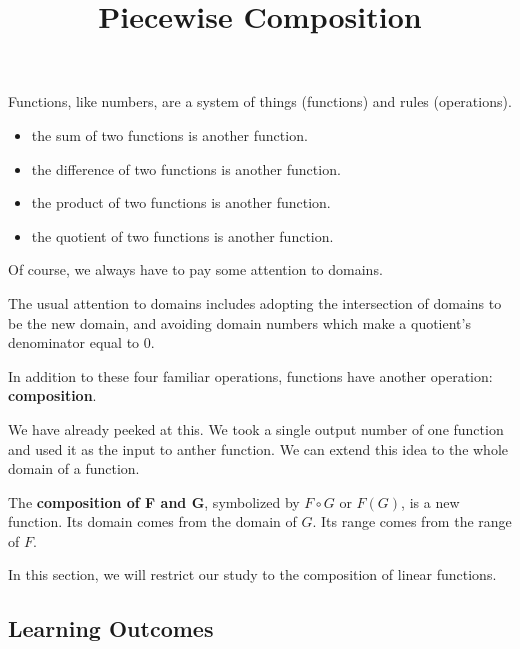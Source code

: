 \documentclass{ximera}
\title{Piecewise Composition}
\begin{document}
\begin{abstract}
\end{abstract}
\maketitle




Functions, like numbers, are a system of things (functions) and rules (operations).  

\begin{itemize}
\item the sum of two functions is another function.
\item the difference of two functions is another function.
\item the product of two functions is another function.
\item the quotient of two functions is another function.
\end{itemize}

Of course, we always have to pay some attention to domains.



The usual attention to domains includes adopting the intersection of domains to be the new domain, and avoiding domain numbers which make a quotient's denominator equal to $0$.



In addition to these four familiar operations, functions have another operation: \textbf{\textcolor{purple!85!blue}{composition}}.

We have already peeked at this. We took a single output number of one function and used it as the input to anther function.  We can extend this idea to the whole domain of a function.


The \textbf{\textcolor{purple!85!blue}{composition of F and G}}, symbolized by $F \circ G$ or $F(G)$, is a new function.  Its domain comes from the domain of $G$. Its range comes from the range of $F$.



In this section, we will restrict our study to the composition of linear functions.














\subsection*{Learning Outcomes}
\end{document}
